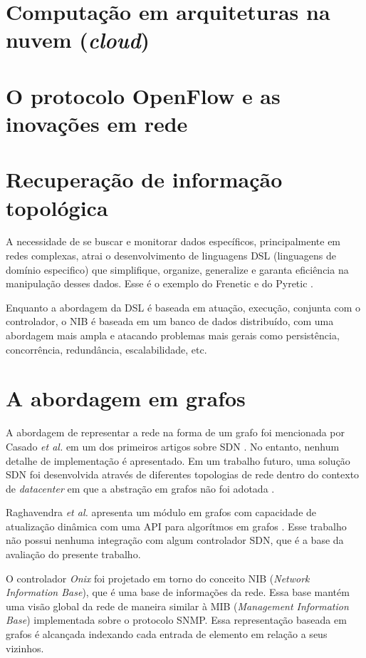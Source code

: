 \section{Computação em arquiteturas na nuvem (\emph{cloud})}

\section{O protocolo OpenFlow e as inovações em rede}

\section{Recuperação de informação topológica}

A necessidade de se buscar e monitorar dados 
específicos, principalmente em redes complexas, atrai o desenvolvimento
de linguagens DSL (linguagens de domínio especifico) que simplifique, 
organize, generalize e garanta eficiência na manipulação desses dados.
Esse é o exemplo do Frenetic \citep{foster2011frenetic} 
e do Pyretic \citep{monsanto2013composing}.

Enquanto a abordagem da DSL é baseada em atuação, execução,
conjunta com o controlador,
o NIB é baseada em um banco de dados distribuído,
com uma abordagem mais ampla e atacando problemas mais gerais
como persistência, concorrência, redundância, escalabilidade, etc.

\section{A abordagem em grafos}

A abordagem de representar a rede na forma de um grafo foi mencionada 
por Casado \emph{et al.} em um dos primeiros artigos sobre SDN
\citep{martin2010virtualizing}.
No entanto, nenhum detalhe de implementação é apresentado.
Em um trabalho futuro, uma solução SDN foi desenvolvida através de 
diferentes topologias de rede dentro do contexto de \emph{datacenter} 
em que a abstração em grafos não foi adotada \citep{ripcord}. 

Raghavendra \emph{et al.} apresenta um módulo em grafos com capacidade 
de atualização dinâmica com uma API para algorítmos em grafos
\citep{ramya2012dynamic}.
Esse trabalho não possui nenhuma integração com algum controlador SDN,
que é a base da avaliação do presente trabalho.

O controlador \emph{Onix} \citep{teemu2010onix} foi projetado em torno do 
conceito NIB (\emph{Network Information Base}), que é uma base 
de informações da rede.
Essa base mantém uma visão global da rede de maneira similar à 
MIB (\emph{Management Information Base}) implementada sobre o
protocolo SNMP.
Essa representação baseada em grafos é alcançada indexando cada
entrada de elemento em relação a seus vizinhos.

